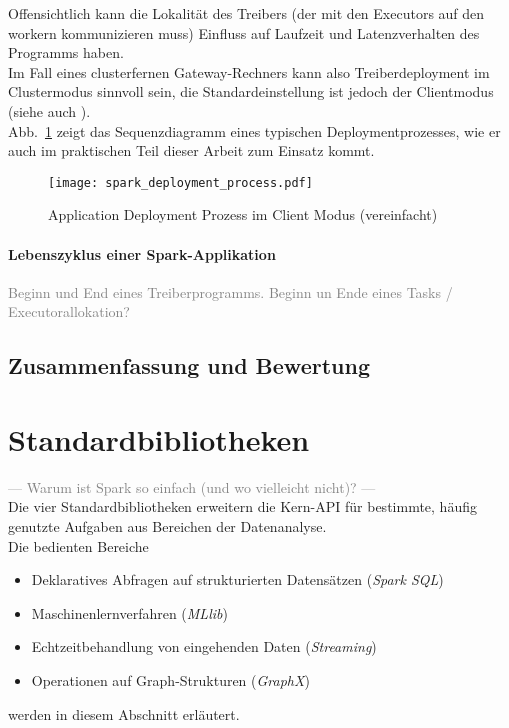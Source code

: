 Offensichtlich kann die Lokalität des Treibers (der mit den Executors auf den \gls{worker}n kommunizieren muss) Einfluss auf Laufzeit und Latenzverhalten des Programms haben.\\

Im Fall eines clusterfernen Gateway-Rechners kann also Treiberdeployment im Clustermodus sinnvoll sein, die Standardeinstellung ist jedoch der Clientmodus (siehe auch \cite{spark_submission}).\\

Abb.~\ref{fig:app_deployment_process} zeigt das Sequenzdiagramm eines typischen Deploymentprozesses, wie er auch im praktischen Teil dieser Arbeit zum Einsatz kommt.

\begin{figure}[ht!]
	\centering
  \texttt{[image: spark\_deployment\_process.pdf]}
	\caption{Application Deployment Prozess im Client Modus (vereinfacht)}
	\label{fig:app_deployment_process}
\end{figure}

\paragraph{Lebenszyklus einer Spark-Applikation}

\textcolor{gray}{Beginn und End eines Treiberprogramms. Beginn un Ende eines Tasks / Executorallokation?}\\

\subsection{Zusammenfassung und Bewertung}

\section{Standardbibliotheken}
\textcolor{gray}{--- Warum ist Spark so einfach (und wo vielleicht nicht)? ---}\\
Die vier Standardbibliotheken erweitern die Kern-API für bestimmte, häufig genutzte Aufgaben aus Bereichen der Datenanalyse.\\

Die bedienten Bereiche
\begin{itemize}
	\item Deklaratives Abfragen auf strukturierten Datensätzen (\textit{Spark SQL})
	\item Maschinenlernverfahren (\textit{MLlib})
	\item Echtzeitbehandlung von eingehenden Daten (\textit{Streaming})
	\item Operationen auf Graph-Strukturen (\textit{GraphX})
\end{itemize}
werden in diesem Abschnitt erläutert.

